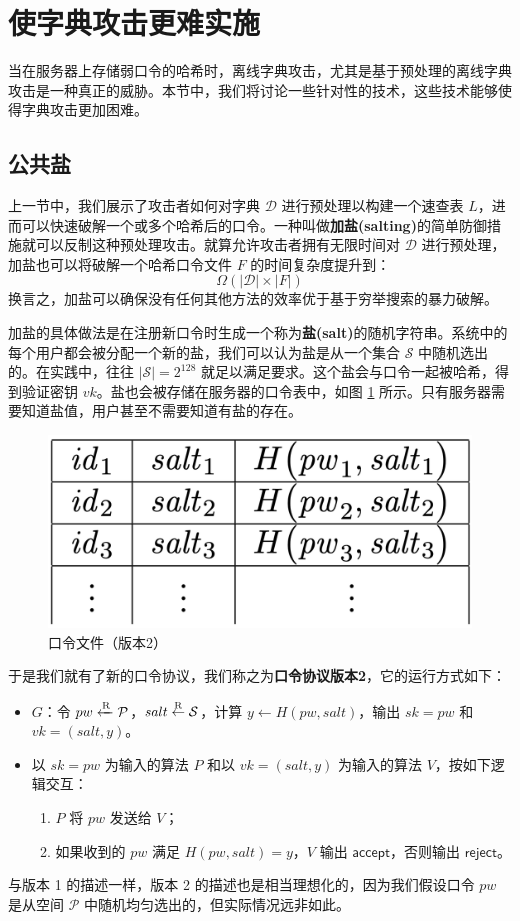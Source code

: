 \section{使字典攻击更难实施}

当在服务器上存储弱口令的哈希时，离线字典攻击，尤其是基于预处理的离线字典攻击是一种真正的威胁。本节中，我们将讨论一些针对性的技术，这些技术能够使得字典攻击更加困难。

\subsection{公共盐}

上一节中，我们展示了攻击者如何对字典 $\mathcal{D}$ 进行预处理以构建一个速查表 $L$，进而可以快速破解一个或多个哈希后的口令。一种叫做\textbf{加盐(salting)}的简单防御措施就可以反制这种预处理攻击。就算允许攻击者拥有无限时间对 $\mathcal{D}$ 进行预处理，加盐也可以将破解一个哈希口令文件 $F$ 的时间复杂度提升到：
$$
\Omega(|\mathcal{D}|\times |F|)
$$
换言之，加盐可以确保没有任何其他方法的效率优于基于穷举搜索的暴力破解。

加盐的具体做法是在注册新口令时生成一个称为\textbf{盐(salt)}的随机字符串。系统中的每个用户都会被分配一个新的盐，我们可以认为盐是从一个集合 $\mathcal{S}$ 中随机选出的。在实践中，往往 $|\mathcal{S}|=2^{128}$ 就足以满足要求。这个盐会与口令一起被哈希，得到验证密钥 $vk$。盐也会被存储在服务器的口令表中，如图 \ref{fig:18-4} 所示。只有服务器需要知道盐值，用户甚至不需要知道有盐的存在。

\begin{figure}
  \centering
  \includegraphics[width=0.3\linewidth]{figures/chapter18/fig4.png}
  \caption{口令文件（版本2）}
  \label{fig:18-4}
\end{figure}

于是我们就有了新的口令协议，我们称之为\textbf{口令协议版本2}，它的运行方式如下：
\begin{itemize}
	\item $G$：令 $pw \xleftarrow{\rm R}\mathcal{P}$，$salt\overset{\rm R}\leftarrow\mathcal{S}$，计算 $y\leftarrow H(pw,salt)$，输出 $sk=pw$ 和 $vk=(salt,y)$。
	\item 以 $sk=pw$ 为输入的算法 $P$ 和以 $vk=(salt,y)$ 为输入的算法 $V$，按如下逻辑交互：
	\begin{enumerate}
		\item $P$ 将 $pw$ 发送给 $V$；
		\item 如果收到的 $pw$ 满足 $H(pw,salt)=y$，$V$ 输出 $\mathsf{accept}$，否则输出 $\mathsf{reject}$。
	\end{enumerate}
\end{itemize}
与版本 1 的描述一样，版本 2 的描述也是相当理想化的，因为我们假设口令 $pw$ 是从空间 $\mathcal{P}$ 中随机均匀选出的，但实际情况远非如此。

